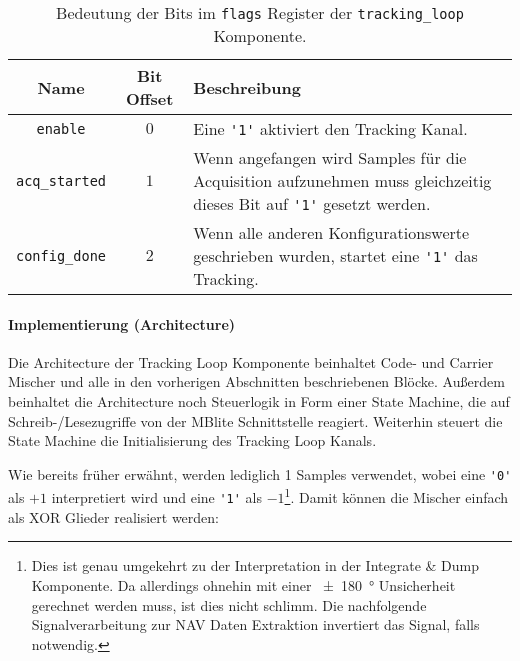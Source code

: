 \begin{table}[htbp]
    \ttabbox
    {
        \caption[Tracking Loop Flag Register]{Bedeutung der Bits im \lstinline$flags$ Register der \lstinline$tracking_loop$ Komponente.}
        \label{Tab_TL_flags}
    }
    {
    \begin{tabular}{c c p{6cm}}
        \toprule
        Name                    & Bit Offset    & Beschreibung \\
        \midrule
        \lstinline$enable$	    & $0$             & Eine \lstinline$'1'$ aktiviert den Tracking Kanal. \\
        \lstinline$acq_started$ & $1$             & Wenn angefangen wird Samples für die Acquisition aufzunehmen muss gleichzeitig dieses Bit auf \lstinline$'1'$ gesetzt werden. \\
        \lstinline$config_done$ & $2$             & Wenn alle anderen Konfigurationswerte geschrieben wurden, startet eine \lstinline$'1'$ das Tracking. \\
        \bottomrule
    \end{tabular}
}
\end{table}

\paragraph{Implementierung (Architecture)}

Die Architecture der Tracking Loop Komponente beinhaltet Code- und Carrier Mischer und alle in den vorherigen Abschnitten beschriebenen Blöcke. Außerdem beinhaltet die Architecture noch Steuerlogik in Form einer State Machine, die auf Schreib-/Lesezugriffe von der MBlite Schnittstelle reagiert. Weiterhin steuert die State Machine die Initialisierung des Tracking Loop Kanals.

Wie bereits früher erwähnt, werden lediglich \SI{1}{\bit} Samples verwendet, wobei eine \lstinline$'0'$ als $+1$ interpretiert wird und eine \lstinline$'1'$ als $-1$\footnote{Dies ist genau umgekehrt zu der Interpretation in der Integrate \& Dump Komponente. Da allerdings ohnehin mit einer \SI{\pm180}{\degree} Unsicherheit gerechnet werden muss, ist dies nicht schlimm. Die nachfolgende Signalverarbeitung zur NAV Daten Extraktion invertiert das Signal, falls notwendig.}. Damit können die Mischer einfach als XOR Glieder realisiert werden:

